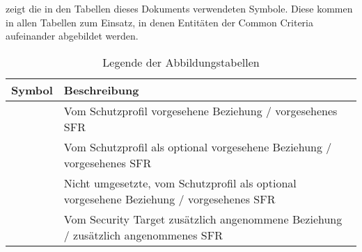 
 zeigt die in den Tabellen dieses
Dokuments verwendeten Symbole. Diese kommen in allen Tabellen zum
Einsatz, in denen Entitäten der Common Criteria aufeinander abgebildet
werden.

\begin{table}[ht]
  \centering
  \begin{tabularx}{0.75\linewidth}[c]{cX}
    \toprule
    Symbol & Beschreibung\\ \midrule
    \tcheck{} & Vom Schutzprofil vorgesehene Beziehung / vorgesehenes SFR \\
    \toptio{} & Vom Schutzprofil als optional vorgesehene Beziehung / vorgesehenes SFR\\
    \tdrop{} & Nicht umgesetzte, vom Schutzprofil als optional vorgesehene Beziehung / vorgesehenes SFR\\
    \tadded{} & Vom Security Target zusätzlich angenommene Beziehung / zusätzlich angenommenes SFR\\
    \bottomrule
  \end{tabularx}
  \hypertarget{tab:o.mappinglegende}{\caption{Legende der Abbildungstabellen}}
  \label{tab:o.mappinglegende}
\end{table}




